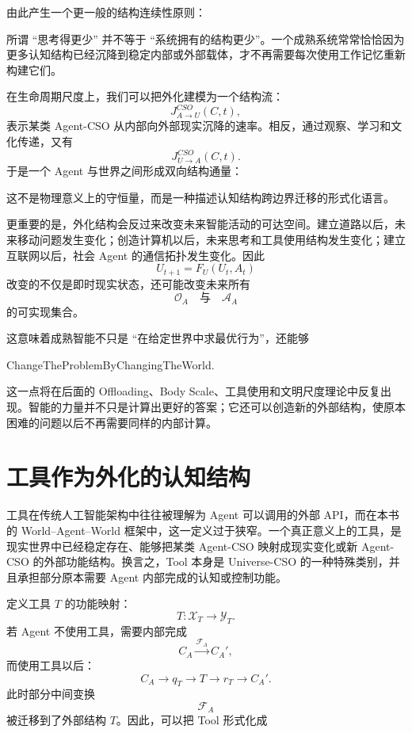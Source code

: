 由此产生一个更一般的结构连续性原则：
\begin{statementbox}
\centering
{}
\end{statementbox}
所谓 ``思考得更少'' 并不等于 ``系统拥有的结构更少''。一个成熟系统常常恰恰因为更多认知结构已经沉降到稳定内部或外部载体，才不再需要每次使用工作记忆重新构建它们。

在生命周期尺度上，我们可以把外化建模为一个结构流：
\[
J_{A\rightarrow U}^{CSO}(C,t),
\]
表示某类 Agent-CSO 从内部向外部现实沉降的速率。相反，通过观察、学习和文化传递，又有
\[
J_{U\rightarrow A}^{CSO}(C,t).
\]
于是一个 Agent 与世界之间形成双向结构通量：
\begin{statementbox}
\centering
{}
\end{statementbox}
这不是物理意义上的守恒量，而是一种描述认知结构跨边界迁移的形式化语言。

更重要的是，外化结构会反过来改变未来智能活动的可达空间。建立道路以后，未来移动问题发生变化；创造计算机以后，未来思考和工具使用结构发生变化；建立互联网以后，社会 Agent 的通信拓扑发生变化。因此
\[
U_{t+1}
=
F_U(U_t,A_t)
\]
改变的不仅是即时现实状态，还可能改变未来所有
\[
\mathcal O_A
\quad\text{与}\quad
\mathcal A_A
\]
的可实现集合。

这意味着成熟智能不只是 ``在给定世界中求最优行为''，还能够
\begin{statementbox}
ChangeTheProblemByChangingTheWorld.
\end{statementbox}
这一点将在后面的 Offloading、Body Scale、工具使用和文明尺度理论中反复出现。智能的力量并不只是计算出更好的答案；它还可以创造新的外部结构，使原本困难的问题以后不再需要同样的内部计算。


\section{工具作为外化的认知结构}

工具在传统人工智能架构中往往被理解为 Agent 可以调用的外部 API，而在本书的 World--Agent--World 框架中，这一定义过于狭窄。一个真正意义上的工具，是现实世界中已经稳定存在、能够把某类 Agent-CSO 映射成现实变化或新 Agent-CSO 的外部功能结构。换言之，Tool 本身是 Universe-CSO 的一种特殊类别，并且承担部分原本需要 Agent 内部完成的认知或控制功能。

定义工具 $T$ 的功能映射：
\[
T:
\mathcal X_T
\rightarrow
\mathcal Y_T.
\]
若 Agent 不使用工具，需要内部完成
\[
C_A
\xrightarrow{\mathcal F_A}
C_A',
\]
而使用工具以后：
\[
C_A
\rightarrow
q_T
\rightarrow
T
\rightarrow
r_T
\rightarrow
C_A'.
\]
此时部分中间变换
\[
\mathcal F_A
\]
被迁移到了外部结构 $T$。因此，可以把 Tool 形式化成
\begin{statementbox}
\centering
{}
\end{statementbox}

